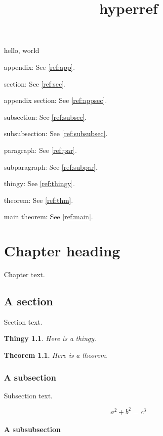 \documentclass{amsbook}
\title{hyperref}
\newtheorem{x}{Thingy}
\newtheorem{thm}{Theorem}
\begin{document}
\frontmatter

\mainmatter

hello, world


appendix: See \autoref{ref:app}.

section: See \autoref{ref:sec}.

appendix section: See \autoref{ref:appsec}.

subsection: See \autoref{ref:subsec}.

subsubsection: See \autoref{ref:subsubsec}.

paragraph: See \autoref{ref:par}.

subparagraph: See \autoref{ref:subpar}.

thingy: See \autoref{ref:thingy}.

theorem: See \autoref{ref:thm}.

main theorem: See \autoref{ref:main}.

\newpage

\chapter{Chapter heading}
\label{ref:chap}

Chapter text.

\section{A section}
\label{ref:sec}

Section text.

\begin{x}\label{ref:thingy}
Here is a thingy.
\end{x}

\begin{thm}\label{ref:thm}
Here is a theorem.
\end{thm}

\subsection{A subsection}
\label{ref:subsec}

Subsection text.

\begin{equation}\label{ref:equation}
a^2 + b^2 = c^3
\end{equation}

\subsubsection{A subsubsection}
\label{ref:subsubsec}
\end{document}
